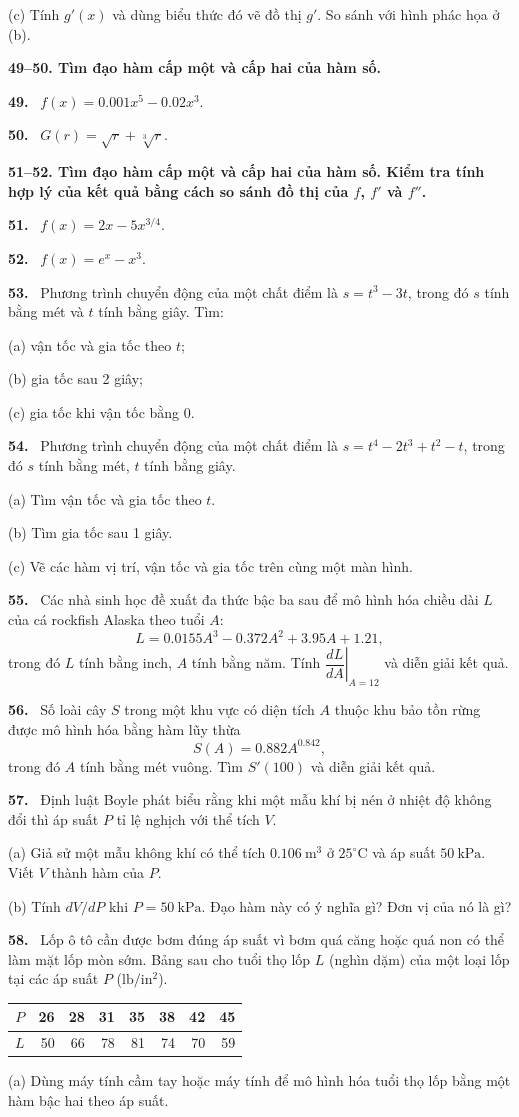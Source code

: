 \documentclass[12pt,a4paper]{article}
\newcommand{\bt}[1]{\par\smallskip\noindent\textbf{#1.}\ }
\newcommand{\group}[1]{\par\medskip\noindent\textbf{#1}\par\nopagebreak[4]}
\begin{document}
(c) Tính $g'(x)$ và dùng biểu thức đó vẽ đồ thị $g'$. So sánh với hình phác họa ở (b).
\group{49–50. Tìm đạo hàm cấp một và cấp hai của hàm số.}
\bt{49} $f(x)=0.001x^5-0.02x^3$.
\bt{50} $G(r)=\sqrt r+\sqrt[3]r$.
\group{51–52. Tìm đạo hàm cấp một và cấp hai của hàm số. Kiểm tra tính hợp lý của kết quả bằng cách so sánh đồ thị của $f$, $f'$ và $f''$.}
\bt{51} $f(x)=2x-5x^{3/4}$.
\bt{52} $f(x)=e^x-x^3$.
\bt{53} Phương trình chuyển động của một chất điểm là $s=t^3-3t$, trong đó $s$ tính bằng mét và $t$ tính bằng giây. Tìm:

(a) vận tốc và gia tốc theo $t$;

(b) gia tốc sau 2 giây;

(c) gia tốc khi vận tốc bằng 0.
\bt{54} Phương trình chuyển động của một chất điểm là $s=t^4-2t^3+t^2-t$, trong đó $s$ tính bằng mét, $t$ tính bằng giây.

(a) Tìm vận tốc và gia tốc theo $t$.

(b) Tìm gia tốc sau 1 giây.

(c) Vẽ các hàm vị trí, vận tốc và gia tốc trên cùng một màn hình.
\bt{55} Các nhà sinh học đề xuất đa thức bậc ba sau để mô hình hóa chiều dài $L$ của cá rockfish Alaska theo tuổi $A$:
\[L=0.0155A^3-0.372A^2+3.95A+1.21,\]
trong đó $L$ tính bằng inch, $A$ tính bằng năm. Tính $\left.\dfrac{dL}{dA}\right|_{A=12}$ và diễn giải kết quả.
\begin{samepage}
\bt{56} Số loài cây $S$ trong một khu vực có diện tích $A$ thuộc khu bảo tồn rừng được mô hình hóa bằng hàm lũy thừa
\[S(A)=0.882A^{0.842},\]
trong đó $A$ tính bằng mét vuông. Tìm $S'(100)$ và diễn giải kết quả.
\end{samepage}
\bt{57} Định luật Boyle phát biểu rằng khi một mẫu khí bị nén ở nhiệt độ không đổi thì áp suất $P$ tỉ lệ nghịch với thể tích $V$.

(a) Giả sử một mẫu không khí có thể tích $0.106\ \mathrm{m^3}$ ở $25^{\circ}\mathrm C$ và áp suất $50\ \mathrm{kPa}$. Viết $V$ thành hàm của $P$.

(b) Tính $dV/dP$ khi $P=50\ \mathrm{kPa}$. Đạo hàm này có ý nghĩa gì? Đơn vị của nó là gì?
\bt{58} Lốp ô tô cần được bơm đúng áp suất vì bơm quá căng hoặc quá non có thể làm mặt lốp mòn sớm. Bảng sau cho tuổi thọ lốp $L$ (nghìn dặm) của một loại lốp tại các áp suất $P$ ($\mathrm{lb/in^2}$).
\begin{center}\begin{tabular}{c|rrrrrrr}
$P$&26&28&31&35&38&42&45\\\hline
$L$&50&66&78&81&74&70&59
\end{tabular}\end{center}
(a) Dùng máy tính cầm tay hoặc máy tính để mô hình hóa tuổi thọ lốp bằng một hàm bậc hai theo áp suất.
\end{document}
